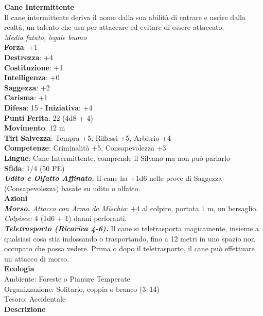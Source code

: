 \begin{multicols}{2}
\medskip\textbf{Cane Intermittente}\\
Il cane intermittente deriva il nome dalla sua abilità di entrare e uscire dalla realtà, un talento che usa per attaccare ed evitare di essere attaccato. \\
\emph{Media fatato, legale buono}\\
\textbf{Forza}: +1\\
\textbf{Destrezza}: +4\\
\textbf{Costituzione}: +1\\
\textbf{Intelligenza}: +0\\
\textbf{Saggezza}: +2\\
\textbf{Carisma}: +1\\
\textbf{Difesa}: 15 - \textbf{Iniziativa}: +4\\
\textbf{Punti Ferita}: 22 (4d8 + 4)\\
\textbf{Movimento}: 12 m\\
\textbf{Tiri Salvezza}:  Tempra +5, Riflessi +5, Arbitrio +4 \\
\textbf{Competenze}: Criminalità +5, Consapevolezza +3\\
\textbf{Lingue}: Cane Intermittente, comprende il Silvano ma non può parlarlo\\
\textbf{Sfida}: 1/4 (50 PE)\smallskip\\
\emph{\textbf{Udito e Olfatto Affinato.}} Il cane ha +1d6 nelle prove di Saggezza (Consapevolezza) basate su udito o olfatto.\\
\smallskip\textbf{Azioni}\\
\emph{\textbf{Morso.} Attacco con Arma da Mischia}: +4 al colpire, portata 1 m, un bersaglio.\\
\emph{Colpisce:} 4 (1d6 + 1) danni perforanti.\\
\emph{\textbf{Teletrasporto (Ricarica 4-6).}} Il cane si teletrasporta magicamente, insieme a qualsiasi cosa stia indossando o trasportando, fino a 12 metri in uno spazio non occupato che possa vedere. Prima o dopo il teletrasporto, il cane può effettuare un attacco di morso.\\
\textbf{Ecologia}\\
Ambiente: Foreste o Pianure Temperate\\
Organizzazione: Solitario, coppia o branco (3–14)\\
Tesoro: Accidentale\\
\textbf{Descrizione}\\


\end{multicols}
